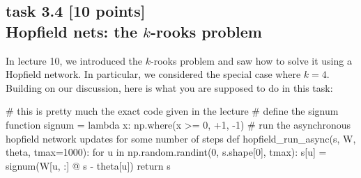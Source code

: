 
\subsection*{task 3.4 [10 points] \\[1ex] Hopfield nets: the $k$-rooks problem}

In lecture 10, we introduced the $k$-rooks problem and saw how to solve it using a Hopfield network. In particular, we considered the special case where $k=4$. Building on our discussion, here is what you are supposed to do in this task:

\begin{python}
# this is pretty much the exact code given in the lecture
# define the signum function
signum = lambda x: np.where(x >= 0, +1, -1)
# run the asynchronous hopfield network updates for some number of steps
def hopfield_run_async(s, W, theta, tmax=1000):
    for u in np.random.randint(0, s.shape[0], tmax):
        s[u] = signum(W[u, :] @ s - theta[u])
    return s
\end{python}
